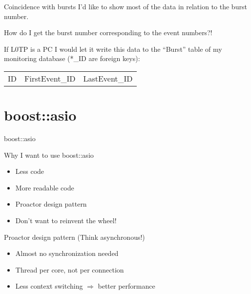 \begin{frame}{Coincidence with bursts}
	I'd like to show most of the data in relation to the burst number.
	
	\begin{ergo}
		How do I get the burst number corresponding to the event numbers?!
	\end{ergo}
	
	\vspace{1cm}
	If L0TP is a PC I would let it write this data to the ``Burst'' table of
	my monitoring database (*\_ID are foreign keys):
	\begin{table}
		\begin{tabular}{ccc}
			ID	&	FirstEvent\_ID	&	LastEvent\_ID \\
		\end{tabular}
	\end{table} 
\end{frame}








\section{boost::asio}

\begin{frame}{boost::asio}
	\begin{block}{Why I want to use boost::asio}
		\begin{itemize}
		  \item Less code
		  \item More readable code
		  \item Proactor design pattern
		  \item Don't want to reinvent the wheel!
		\end{itemize}
	\end{block}
	\begin{exampleblock}{Proactor design pattern (Think asynchronous!)}
		\begin{itemize}
		  \item Almost no synchronization needed
		  \item Thread per core, not per connection
		  \item Less context switching $\Rightarrow$ better performance
		\end{itemize}
	\end{exampleblock}
\end{frame}

